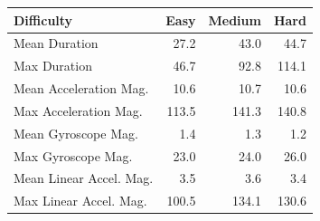 \begin{tabular}{lrrr}
\toprule
Difficulty &  Easy &  Medium &  Hard \\
\midrule
Mean Duration           &  27.2 &    43.0 &  44.7 \\
Max Duration            &  46.7 &    92.8 & 114.1 \\
Mean Acceleration Mag.  &  10.6 &    10.7 &  10.6 \\
Max Acceleration Mag.   & 113.5 &   141.3 & 140.8 \\
Mean Gyroscope Mag.     &   1.4 &     1.3 &   1.2 \\
Max Gyroscope Mag.      &  23.0 &    24.0 &  26.0 \\
Mean Linear Accel. Mag. &   3.5 &     3.6 &   3.4 \\
Max Linear Accel. Mag.  & 100.5 &   134.1 & 130.6 \\
\bottomrule
\end{tabular}
